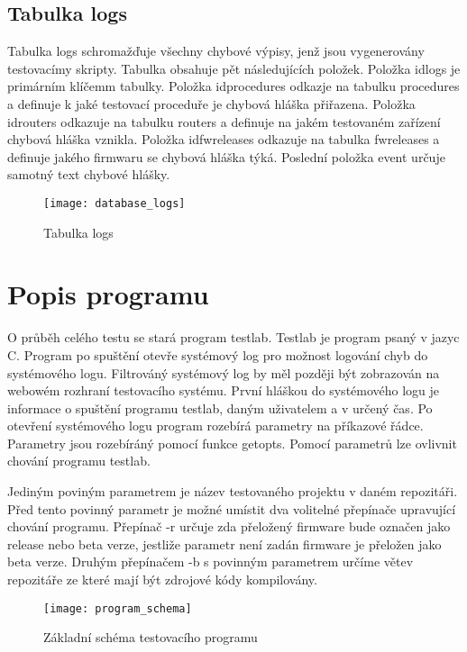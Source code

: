 \subsection{Tabulka logs}
Tabulka logs schromažďuje všechny chybové výpisy, jenž jsou vygenerovány testovacímy skripty. Tabulka obsahuje pět následujících položek. Položka idlogs je primárním klíčemm tabulky. Položka idprocedures odkazje na tabulku procedures a definuje k jaké testovací proceduře je chybová hláška přiřazena. Položka idrouters odkazuje na tabulku routers a definuje na jakém testovaném zařízení chybová hláška vznikla. Položka idfwreleases odkazuje na tabulka fwreleases a definuje jakého firmwaru se chybová hláška týká. Poslední položka event určuje samotný text chybové hlášky.

\begin{figure}[h]
  \centering
  \texttt{[image: database\_logs]}
  \caption{Tabulka logs}
  \label{fig:database_logs}
\end{figure}

\section{Popis programu}

O průběh celého testu se stará program testlab. Testlab je program psaný v jazyc C. Program po spuštění otevře systémový log pro možnost logování chyb do systémového logu. Filtrováný systémový log by měl později být zobrazován na webowém rozhraní testovacího systému. První hláškou do systémového logu je informace o spuštění programu testlab, daným uživatelem a v určený čas. Po otevření systémového logu program rozebírá parametry na příkazové řádce. Parametry jsou rozebíráný pomocí funkce getopts. Pomocí parametrů lze ovlivnit chování programu testlab.

Jediným poviným parametrem je název testovaného projektu v daném repozitáři. Před tento povinný parametr je možné umístit dva volitelné přepínače upravující chování programu. Přepínač -r určuje zda přeložený firmware bude označen jako release nebo beta verze, jestliže parametr není zadán firmware je přeložen jako beta verze. Druhým přepínačem -b s povinným parametrem určíme větev repozitáře ze které mají být zdrojové kódy kompilovány.

\begin{figure}[h]
  \centering
  \texttt{[image: program\_schema]}
  \caption{Základní schéma testovacího programu}
  \label{fig:program_schema}
\end{figure}


